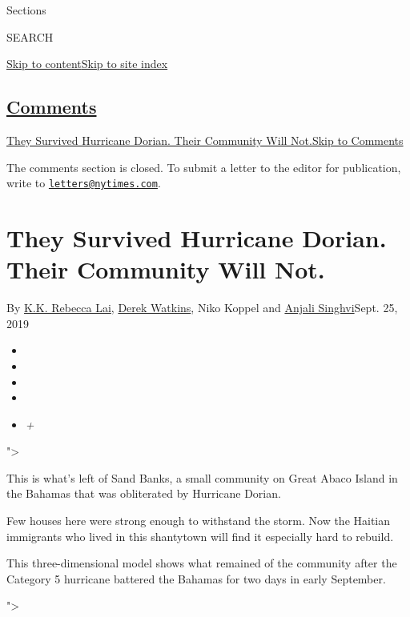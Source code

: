 Sections

SEARCH

\protect\hyperlink{site-content}{Skip to
content}\protect\hyperlink{site-index}{Skip to site index}

\hypertarget{comments}{%
\subsection{\texorpdfstring{\protect\hyperlink{commentsContainer}{Comments}}{Comments}}\label{comments}}

\href{}{They Survived Hurricane Dorian. Their Community Will
Not.}\href{}{Skip to Comments}

The comments section is closed. To submit a letter to the editor for
publication, write to
\href{mailto:letters@nytimes.com}{\nolinkurl{letters@nytimes.com}}.

\hypertarget{they-survived-hurricane-dorian-their-community-will-not}{%
\section{They Survived Hurricane Dorian. Their Community Will
Not.}\label{they-survived-hurricane-dorian-their-community-will-not}}

By \href{https://www.nytimes.com/by/kk-rebecca-lai}{K.K. Rebecca Lai},
\href{https://www.nytimes.com/by/derek-watkins}{Derek Watkins}, Niko
Koppel and \href{https://www.nytimes.com/by/anjali-singhvi}{Anjali
Singhvi}Sept. 25, 2019

\begin{itemize}
\item
\item
\item
\item
\item
  \emph{+}
\end{itemize}

"\textgreater{}

This is what's left of Sand Banks, a small community on Great Abaco
Island in the Bahamas that was obliterated by Hurricane Dorian.

Few houses here were strong enough to withstand the storm. Now the
Haitian immigrants who lived in this shantytown will find it especially
hard to rebuild.

This three-dimensional model shows what remained of the community after
the Category 5 hurricane battered the Bahamas for two days in early
September.

"\textgreater{}

